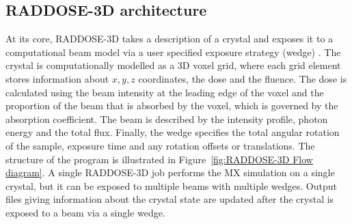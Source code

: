 \subsection{RADDOSE-3D architecture}
\label{sub:RADDOSE-3D Architecture}
At its core, RADDOSE-3D takes a description of a crystal and exposes it to a computational beam model via a user specified exposure strategy (wedge) \cite{zeldin2013}.
The crystal is computationally modelled as a 3D voxel grid, where each grid element stores information about $x, y, z$ coordinates, the dose and the fluence.
The dose is calculated using the beam intensity at the leading edge of the voxel and the proportion of the beam that is absorbed by the voxel, which is governed by the absorption coefficient.
The beam is described by the intensity profile, photon energy and the total flux.
Finally, the wedge specifies the total angular rotation of the sample, exposure time and any rotation offsets or translations.
The structure of the program is illustrated in Figure~\ref{fig:RADDOSE-3D Flow diagram}.
A single RADDOSE-3D job performs the MX simulation on a single crystal, but it can be exposed to multiple beams with multiple wedges.
Output files giving information about the crystal state are updated after the crystal is exposed to a beam via a single wedge.
